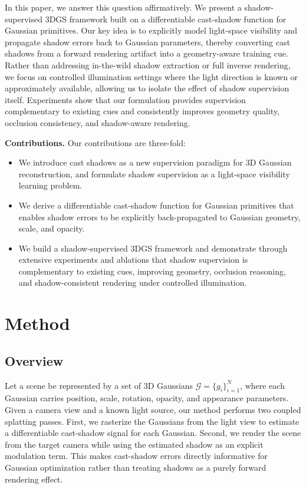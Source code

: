 In this paper, we answer this question affirmatively. We present a shadow-supervised 3DGS framework built on a differentiable cast-shadow function for Gaussian primitives. Our key idea is to explicitly model light-space visibility and propagate shadow errors back to Gaussian parameters, thereby converting cast shadows from a forward rendering artifact into a geometry-aware training cue. Rather than addressing in-the-wild shadow extraction or full inverse rendering, we focus on controlled illumination settings where the light direction is known or approximately available, allowing us to isolate the effect of shadow supervision itself. Experiments show that our formulation provides supervision complementary to existing cues and consistently improves geometry quality, occlusion consistency, and shadow-aware rendering.

\noindent\textbf{Contributions.}
Our contributions are three-fold:
\begin{itemize}
    \item We introduce cast shadows as a new supervision paradigm for 3D Gaussian reconstruction, and formulate shadow supervision as a light-space visibility learning problem.
    
    \item We derive a differentiable cast-shadow function for Gaussian primitives that enables shadow errors to be explicitly back-propagated to Gaussian geometry, scale, and opacity.
    
    \item We build a shadow-supervised 3DGS framework and demonstrate through extensive experiments and ablations that shadow supervision is complementary to existing cues, improving geometry, occlusion reasoning, and shadow-consistent rendering under controlled illumination.
\end{itemize}

\section{Method}
\label{sec:method}

\subsection{Overview}
Let a scene be represented by a set of 3D Gaussians $\mathcal{G}=\{g_i\}_{i=1}^N$, where each Gaussian carries position, scale, rotation, opacity, and appearance parameters. Given a camera view and a known light source, our method performs two coupled splatting passes. First, we rasterize the Gaussians from the light view to estimate a differentiable cast-shadow signal for each Gaussian. Second, we render the scene from the target camera while using the estimated shadow as an explicit modulation term. This makes cast-shadow errors directly informative for Gaussian optimization rather than treating shadows as a purely forward rendering effect.

